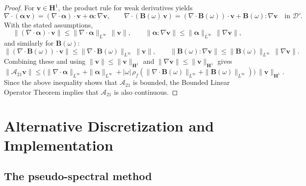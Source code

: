 \documentclass[pdflatex,sn-mathphys-num]{sn-jnl}
\theoremstyle{thmstyleone}%
\theoremstyle{thmstyletwo}%
\theoremstyle{thmstylethree}%
\theoremstyle{definition}
\begin{document}
	\begin{proof}
		For $\mathbf{v}\in\bm{H}^{1}$, the product rule for weak derivatives yields
		\[
		\nabla\!\cdot(\boldsymbol{\alpha}\,\mathbf{v})
		= (\nabla\!\cdot\boldsymbol{\alpha})\cdot\mathbf{v} + \boldsymbol{\alpha}:\nabla\mathbf{v},
		\qquad
		\nabla\!\cdot(\mathbf{B}(\omega)\,\mathbf{v})
		= (\nabla\!\cdot\mathbf{B}(\omega))\cdot\mathbf{v} + \mathbf{B}(\omega):\nabla\mathbf{v}
		\quad\text{in } \mathscr{D}'.
		\]
		With the stated assumptions,
		\[
		\|(\nabla\!\cdot\boldsymbol{\alpha})\cdot\mathbf{v}\|
		\le \|\nabla\!\cdot\boldsymbol{\alpha}\|_{L^\infty}\,\|\mathbf{v}\|,
		\qquad
		\|\boldsymbol{\alpha}:\nabla\mathbf{v}\|
		\le \|\boldsymbol{\alpha}\|_{L^\infty}\,\|\nabla\mathbf{v}\|,
		\]
		and similarly for $\mathbf{B}(\omega)$:
		\[
		\|(\nabla\!\cdot\mathbf{B}(\omega))\cdot\mathbf{v}\|
		\le \|\nabla\!\cdot\mathbf{B}(\omega)\|_{L^\infty}\,\|\mathbf{v}\|,
		\qquad
		\|\mathbf{B}(\omega):\nabla\mathbf{v}\|
		\le \|\mathbf{B}(\omega)\|_{L^\infty}\,\|\nabla\mathbf{v}\|.
		\]
		Combining these and using $\|\mathbf{v}\|\le \|\mathbf{v}\|_{\bm{H}^1}$ and
		$\|\nabla\mathbf{v}\|\le \|\mathbf{v}\|_{\bm{H}^1}$ gives
		\[
		\|\mathcal{A}_{21}\mathbf{v}\|
		\le \Big(\|\nabla\!\cdot\boldsymbol{\alpha}\|_{L^\infty}
		+ \|\boldsymbol{\alpha}\|_{L^\infty}
		+ |\omega|\,\rho_f(\|\nabla\!\cdot\mathbf{B}(\omega)\|_{L^\infty}
		+ \|\mathbf{B}(\omega)\|_{L^\infty})\Big)\,\|\mathbf{v}\|_{\bm{H}^{1}}.
		\]
		Since the above inequality shows that $\mathcal{A}_{21}$ is bounded, the Bounded Linear Operator Theorem implies that $\mathcal{A}_{21}$ is also continuous.
	\end{proof}
	
	
	
	
	
	

	
	
	

	
	
	
	
	
	
	
	
	

	
	
	
	
	\section{Alternative Discretization and Implementation}\label{sec: psm}
	
	\subsection{The pseudo-spectral method} 
	
\end{document}
